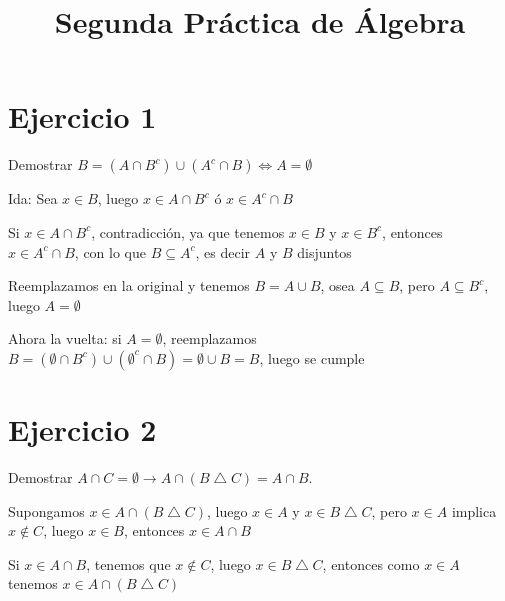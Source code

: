 \documentclass{article}
\title{Segunda Práctica de Álgebra}
\begin{document}
	\maketitle
	\section{Ejercicio 1}
	Demostrar $B = \left(A \cap B^c\right) \cup \left(A^c \cap B\right) \iff A = \emptyset$

	Ida: Sea $x \in B$, luego $x \in A \cap B^c$ ó $x \in A^c \cap B$

	Si $x \in A \cap B^c$, contradicción, ya que tenemos $x \in B$ y $x \in B^c$, entonces
	$x \in A^c \cap B$, con lo que $B \subseteq A^c$, es decir $A$ y $B$ disjuntos

	Reemplazamos en la original y tenemos $B = A \cup B$, osea $A \subseteq B$, pero
	$A \subseteq B^c$, luego $A = \emptyset$

	Ahora la vuelta: si $A = \emptyset$, reemplazamos $B = (\emptyset \cap B^c)
	\cup (\emptyset^c \cap B) = \emptyset \cup B = B$, luego se cumple

	\section{Ejercicio 2}
	Demostrar $A \cap C = \emptyset \rightarrow A \cap (B \bigtriangleup C) = A \cap B$.

	Supongamos $x \in A \cap (B \bigtriangleup C)$, luego $x \in A$ y $x \in B
	\bigtriangleup C$, pero $x \in A$ implica $x \notin C$, luego $x \in B$, entonces
	$x \in A \cap B$

	Si $x \in A \cap B$, tenemos que $x \notin C$, luego $x \in B \bigtriangleup C$,
	entonces como $x \in A$ tenemos $x \in A \cap (B \bigtriangleup C)$
\end{document}
